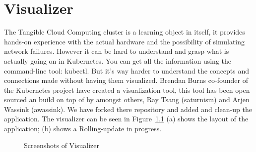 \chapter{Visualizer}
\label{appendix:visualizer}

The Tangible Cloud Computing cluster is a learning object in itself, it provides hands-on experience with the actual hardware and the possibility of simulating network failures. However it can be hard to understand and grasp what is actually going on in Kubernetes. You can get all the information using the command-line tool: kubectl. But it's way harder to understand the concepts and connections made without having them visualized. Brendan Burns co-founder of the Kubernetes project have created a visualization tool, this tool has been open sourced an build on top of by amongst others, Ray Tsang (saturnism) and Arjen Wassink (awassink). We have forked there repository and added and clean-up the application. The visualizer can be seen in Figure~\ref{fig:visualizer} (a) shows the layout of the application; (b) shows a Rolling-update in progress. 
\begin{figure}[H]%
    \centering
    \qquad
    \caption{Screenshots of Visualizer}%
    \label{fig:visualizer}%
\end{figure}

